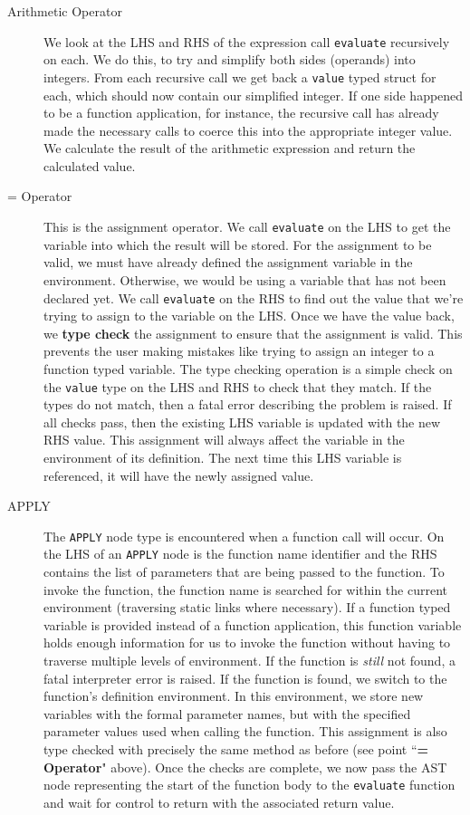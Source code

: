 \begin{description}
	\item[Arithmetic Operator] We look at the LHS and RHS of the expression call \verb!evaluate! recursively on each. We do this, to try and simplify both sides (operands) into integers. From each recursive call we get back a \verb!value! typed struct for each, which should now contain our simplified integer. If one side happened to be a function application, for instance, the recursive call has already made the necessary calls to coerce this into the appropriate integer value. We calculate the result of the arithmetic expression and return the calculated value.
	\item[= Operator] This is the assignment operator. We call \verb!evaluate! on the LHS to get the variable into which the result will be stored. For the assignment to be valid, we must have already defined the assignment variable in the environment. Otherwise, we would be  using a variable that has not been declared yet. We call \verb!evaluate! on the RHS to find out the value that we're trying to assign to the variable on the LHS. Once we have the value back, we \textbf{type check} the assignment to ensure that the assignment is valid. This prevents the user making mistakes like trying to assign an integer to a function typed variable. The type checking operation is a simple check on the \verb!value! type on the LHS and RHS to check that they match. If the types do not match, then a fatal error describing the problem is raised. If all checks pass, then the existing LHS variable is updated with the new RHS value. This assignment will always affect the variable in the environment of its definition. The next time this LHS variable is referenced, it will have the newly assigned value.
	\item[APPLY] The \verb!APPLY! node type is encountered when a function call will occur. On the LHS of an \verb!APPLY! node is the function name identifier and the RHS contains the list of parameters that are being passed to the function. To invoke the function, the function name is searched for within the current environment (traversing static links where necessary). If a function typed variable is provided instead of a function application, this function variable holds enough information for us to invoke the function without having to traverse multiple levels of environment. If the function is \emph{still} not found, a fatal interpreter error is raised. If the function is found, we switch to the function's definition environment. In this environment, we store new variables with the formal parameter names, but with the specified parameter values used when calling the function. This assignment is also type checked with precisely the same method as before (see point ``\textbf{= Operator}" above). Once the checks are complete, we now pass the AST node representing the start of the function body to the \verb!evaluate! function and wait for control to return with the associated return value.

\end{description}
